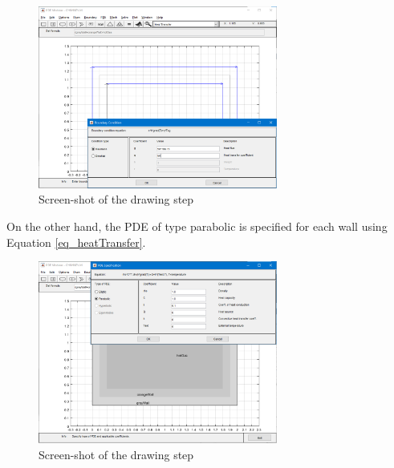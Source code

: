 \documentclass{article}
\begin{document}
\begin{figure}[h!]
\centering
\includegraphics[width=0.70\textwidth]{./img/3_specifyBoundaryConditions.png}
\caption{Screen-shot of the drawing step}
\label{fig_specifyBoundaryConditions}
\end{figure}

On the other hand, the PDE of type parabolic is specified for each wall using Equation \ref{eq_heatTransfer}.

\begin{figure}[h!]
\centering
\includegraphics[width=0.70\textwidth]{./img/4_specifyThePDEtype.png}
\caption{Screen-shot of the drawing step}
\label{fig_SKETCH}
\end{figure}


\end{document}
